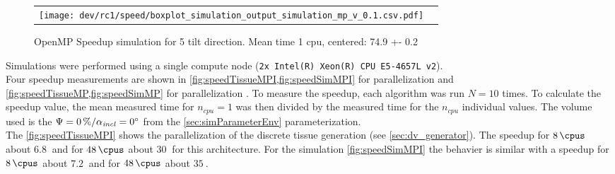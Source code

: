 % 
\begin{figure}[!t]
\centering
% 
\begin{lrbox}{\newtable}
\end{lrbox}
% 
\begin{tabular}{cc}
\begin{minipage}{0.6\textwidth}
\texttt{[image: dev/rc1/speed/boxplot\_simulation\_output\_simulation\_mp\_v\_0.1.csv.pdf]}
\end{minipage}
&
\begin{minipage}{0.25\textwidth}
\usebox{\newtable}
\end{minipage}
\end{tabular}
\caption[]{OpenMP Speedup simulation for 5 tilt direction. Mean time 1 cpu, centered: 74.9 +- 0.2}
\label{fig:speedSimMP}
\end{figure}
% 
Simulations were performed using a single compute node (\texttt{2x Intel(R) Xeon(R) CPU E5-4657L v2}).
\\
% 
Four speedup measurements are shown in \cref{fig:speedTissueMPI,fig:speedSimMPI} for parallelization \mpi{} and \cref{fig:speedTissueMP,fig:speedSimMP} for parallelization \openmp{}.
To measure the speedup, each algorithm was run $N=10$ times.
To calculate the speedup value, the mean measured time for $n_\mathit{cpu}=1$ was then divided by the measured time for the $n_\mathit{cpu}$ individual values.
The volume used is the $\textnormal{$\Psi$}=\SI{0}{\percent} / \textnormal{$\alpha_{\mathit{incl}}$}=\SI{0}{\degree}$ from the \cref{sec:simParameterEnv} parameterization.
\\
% 
The \cref{fig:speedTissueMPI} shows the parallelization of the discrete tissue generation (see \cref{sec:dv_generator}).
The speedup for $\SI{8}{\cpus}$ about $\SI{6.8}{}$ and for $\SI{48}{\cpus}$ about $\SI{30}{}$ for this architecture.
For the simulation \cref{fig:speedSimMPI} the behavier is similar with a speedup for $\SI{8}{\cpus}$ about $\SI{7.2}{}$ and for $\SI{48}{\cpus}$ about $\SI{35}{}$.
